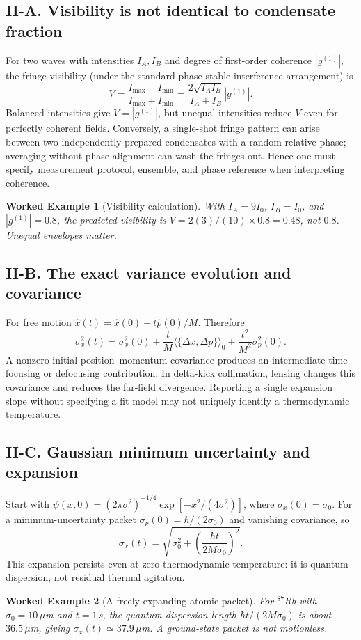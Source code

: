 \documentclass[11pt,a4paper]{article}
\newtheorem{example}{Worked Example}
\begin{document}
\subsection*{II-A. Visibility is not identical to condensate fraction}
For two waves with intensities $I_A,I_B$ and degree of first-order coherence $|g^{(1)}|$, the fringe visibility (under the standard phase-stable interference arrangement) is
\begin{equation}V=\frac{I_{\max}-I_{\min}}{I_{\max}+I_{\min}}=\frac{2\sqrt{I_AI_B}}{I_A+I_B}|g^{(1)}|.\end{equation}
Balanced intensities give $V=|g^{(1)}|$, but unequal intensities reduce $V$ even for perfectly coherent fields. Conversely, a single-shot fringe pattern can arise between two independently prepared condensates with a random relative phase; averaging without phase alignment can wash the fringes out. Hence one must specify measurement protocol, ensemble, and phase reference when interpreting coherence.
\begin{example}[Visibility calculation]
With $I_A=9I_0$, $I_B=I_0$, and $|g^{(1)}|=0.8$, the predicted visibility is $V=2(3)/(10)\times0.8=0.48$, not $0.8$. Unequal envelopes matter.
\end{example}
\subsection*{II-B. The exact variance evolution and covariance}
For free motion $\hat x(t)=\hat x(0)+t\hat p(0)/M$. Therefore
\begin{equation}
\sigma_x^2(t)=\sigma_x^2(0)+\frac tM\langle\{\Delta x,\Delta p\}\rangle_0+\frac{t^2}{M^2}\sigma_p^2(0).
\end{equation}
A nonzero initial position--momentum covariance produces an intermediate-time focusing or defocusing contribution. In delta-kick collimation, lensing changes this covariance and reduces the far-field divergence. Reporting a single expansion slope without specifying a fit model may not uniquely identify a thermodynamic temperature.
\subsection*{II-C. Gaussian minimum uncertainty and expansion}
Start with $\psi(x,0)=(2\pi\sigma_0^2)^{-1/4}\exp[-x^2/(4\sigma_0^2)]$, where $\sigma_x(0)=\sigma_0$. For a minimum-uncertainty packet $\sigma_p(0)=\hbar/(2\sigma_0)$ and vanishing covariance, so
\begin{equation}\sigma_x(t)=\sqrt{\sigma_0^2+\left(\frac{\hbar t}{2M\sigma_0}\right)^2}.\end{equation}
This expansion persists even at zero thermodynamic temperature: it is quantum dispersion, not residual thermal agitation.
\begin{example}[A freely expanding atomic packet]
For $^{87}$Rb with $\sigma_0=10\,\mu$m and $t=1\,$s, the quantum-dispersion length $\hbar t/(2M\sigma_0)$ is about $36.5\,\mu$m, giving $\sigma_x(t)\simeq37.9\,\mu$m. A ground-state packet is not motionless.
\end{example}
\end{document}
